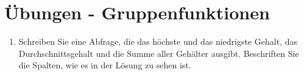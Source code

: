 \clearpage
    \section{\"Ubungen - Gruppenfunktionen}
      \begin{enumerate}
        \item Schreiben Sie eine Abfrage, die das h\"ochste und das niedrigste
        Gehalt, das Durchschnittsgehalt und die Summe aller Geh\"alter ausgibt.
        Beschriften Sie die Spalten, wie es in der L\"osung zu sehen ist.
        \begin{center}
          \begin{small}
            \tablehead{}


\end{small}
\end{center}
\end{enumerate}
